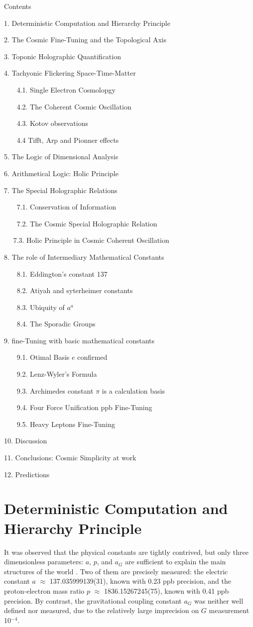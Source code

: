 \documentclass[twoside,draft]{article}
\begin{document}
\begin{sloppypar}
{Contents

1. Deterministic Computation and Hierarchy Principle

2. The Cosmic Fine-Tuning and the Topological Axis

3. Toponic Holographic Quantification

4. Tachyonic Flickering Space-Time-Matter}

~~~   4.1. Single Electron Cosmolopgy
   
~~~    4.2. The Coherent Cosmic Oscillation
   
~~~    4.3. Kotov observations
   
~~~    4.4 Tifft, Arp and Pionner effects
   
5. The Logic of Dimensional Analysis

6. Arithmetical Logic: Holic Principle

7. The Special Holographic Relations

~~~    7.1. Conservation of Information
   
~~~    7.2. The Cosmic Special Holographic Relation

~~     7.3. Holic Principle in Cosmic Coherent Oscillation 
    
8. The role of Intermediary Mathematical Constants

~~~    8.1. Eddington's constant 137
   
~~~    8.2. Atiyah and syterheimer constants
   
~~~    8.3. Ubiquity of $a^a$
   
~~~    8.4. The Sporadic Groups
   
 9. fine-Tuning with basic mathematical constants
 
~~~    9.1. Otimal Basis $e$ confirmed
   
~~~    9.2. Lenz-Wyler's Formula
   
~~~    9.3. Archimedes constant $\pi$ is a calculation basis
   
~~~    9.4. Four Force Unification ppb Fine-Tuning
   
~~~    9.5. Heavy Leptons Fine-Tuning
   
 10. Discussion
 
 11. Conclusions: Cosmic Simplicity at work
 
 12. Predictions
    

\section{Deterministic Computation and Hierarchy Principle}
It was observed that the physical constants are tightly contrived, but only three dimensionless parameters: $a$, $p$, and $a_{G}$ are sufficient to explain the main structures of the world \cite{Eddy}. Two of them are precisely measured: the electric constant $a$ $\approx$ 137.035999139(31), known with 0.23 ppb precision, and the proton-electron mass ratio $p$ $\approx$ 1836.15267245(75), known with 0.41 ppb precision. By contrast, the gravitational coupling constant $a_{G}$ was neither well defined nor measured, due to the relatively large imprecision on $G$ measurement 10$^{-4}\!$.


\end{sloppypar}
\end{document}
